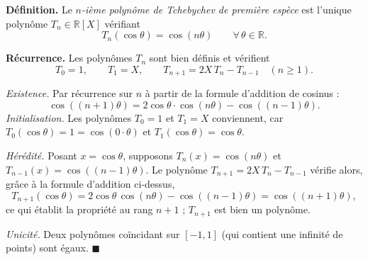 ﻿%



\begin{tcolorbox}[thmbox]
  \textbf{Définition.}\enspace{}
  Le \emph{$n$-ième polynôme de Tchebychev de première espèce} est l'unique
  polynôme $T_n \in \mathbb{R}[X]$ vérifiant
  \[
    T_n(\cos\theta) = \cos(n\theta) \qquad \forall\,\theta \in \mathbb{R}.
  \]

  \medskip
  \textbf{Récurrence.}\enspace{}
  Les polynômes $T_n$ sont bien définis et vérifient
  \[
    T_0 = 1,\qquad T_1 = X,\qquad
    T_{n+1} = 2X\,T_n - T_{n-1} \quad (n \geq 1).
  \]
\end{tcolorbox}


\begin{mdframed}[style=proofbar]
  \textit{Existence.} Par récurrence sur $n$ à partir de la formule
  d'addition de cosinus :
  \[
    \cos((n+1)\theta) = 2\cos\theta\cdot\cos(n\theta) - \cos((n-1)\theta).
  \]
  \emph{Initialisation.} Les polynômes $T_0 = 1$ et $T_1 = X$ conviennent,
  car $T_0(\cos\theta) = 1 = \cos(0\cdot\theta)$ et
  $T_1(\cos\theta) = \cos\theta$.

  \smallskip
  \emph{Hérédité.} Posant $x = \cos\theta$, supposons $T_n(x) = \cos(n\theta)$
  et $T_{n-1}(x) = \cos((n-1)\theta)$. Le polynôme
  $T_{n+1} = 2X\,T_n - T_{n-1}$ vérifie alors, grâce à la formule d'addition
  ci-dessus,
  \[
    T_{n+1}(\cos\theta) = 2\cos\theta\,\cos(n\theta) - \cos((n-1)\theta)
    = \cos((n+1)\theta),
  \]
  ce qui établit la propriété au rang $n+1$ ; $T_{n+1}$ est bien un polynôme.

  \smallskip
  \textit{Unicité.} Deux polynômes coïncidant sur $[-1,1]$ (qui contient
  une infinité de points) sont égaux. \hfill$\blacksquare$
\end{mdframed}


